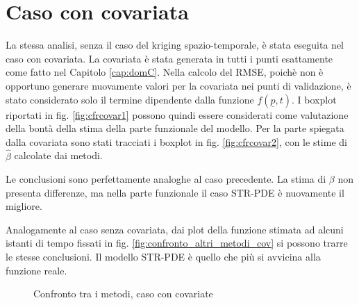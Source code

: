 \documentclass[a4paper,11pt,twoside,openright]{book}							%
\begin{document}
\section{Caso con covariata}

La stessa analisi, senza il caso del kriging spazio-temporale, è stata eseguita nel caso con covariata. La covariata è stata generata in tutti i punti esattamente come fatto nel Capitolo \ref{cap:domC}. Nella calcolo del RMSE, poichè non è opportuno generare nuovamente valori per la covariata nei punti di validazione, è stato considerato solo il termine dipendente dalla funzione $f(\underline p,t)$. I boxplot riportati in fig. \ref{fig:cfrcovar1} possono quindi essere considerati come valutazione della bontà della stima della parte funzionale del modello. Per la parte spiegata dalla covariata sono stati tracciati i boxplot in fig. \ref{fig:cfrcovar2}, con le stime di $\hat{\beta}$ calcolate dai metodi. 

Le conclusioni sono perfettamente analoghe al caso precedente. La stima di $\beta$ non presenta differenze, ma nella parte funzionale il caso STR-PDE è nuovamente il migliore.

Analogamente al caso senza covariata, dai plot della funzione stimata ad alcuni istanti di tempo fissati in fig. \ref{fig:confronto_altri_metodi_cov} si possono trarre le stesse conclusioni. Il modello STR-PDE è quello che più si avvicina alla funzione reale.

\begin{figure}[t]
	\centering
	\caption{Confronto tra i metodi, caso con covariate}
	\label{fig:cfrcovar}
\end{figure}
\end{document}
